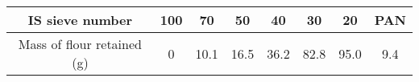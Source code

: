 \begin{center}
\begin{tabular}{|c|c|c|c|c|c|c|c|}
\hline
IS sieve number & 100 & 70 & 50 & 40 & 30 & 20 & PAN \\
\hline
Mass of flour retained (g) & 0 & 10.1 & 16.5 & 36.2 & 82.8 & 95.0 & 9.4 \\
\hline
\end{tabular}
\end{center}